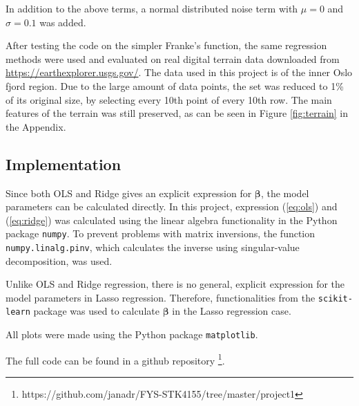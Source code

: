 In addition to the above terms, a normal distributed noise term with $\mu = 0$ and $\sigma = 0.1$ was added.

After testing the code on the simpler Franke's function, the same regression methods were used and evaluated on real digital terrain data downloaded from \url{https://earthexplorer.usgs.gov/}. The data used in this project is of the inner Oslo fjord region. Due to the large amount of data points, the set was reduced to 1\% of its original size, by selecting every 10th point of every 10th row. The main features of the terrain was still preserved, as can be seen in Figure \ref{fig:terrain} in the Appendix. 

\subsection{Implementation}
Since both OLS and Ridge gives an explicit expression for $\boldsymbol{\beta}$, the model parameters can be calculated directly. In this project, expression (\ref{eq:ols}) and (\ref{eq:ridge}) was calculated using the linear algebra functionality in the Python package \texttt{numpy}. To prevent problems with matrix inversions, the function \texttt{numpy.linalg.pinv}, which calculates the inverse using singular-value decomposition, was used. 

Unlike OLS and Ridge regression, there is no general, explicit expression for the model parameters in Lasso regression. Therefore, functionalities from the \texttt{scikit-learn} package was used to calculate $\boldsymbol{\beta}$  in the Lasso regression case.

All plots were made using the Python package \texttt{matplotlib}. 

The full code can be found in a github repository \footnote{https://github.com/janadr/FYS-STK4155/tree/master/project1}.
